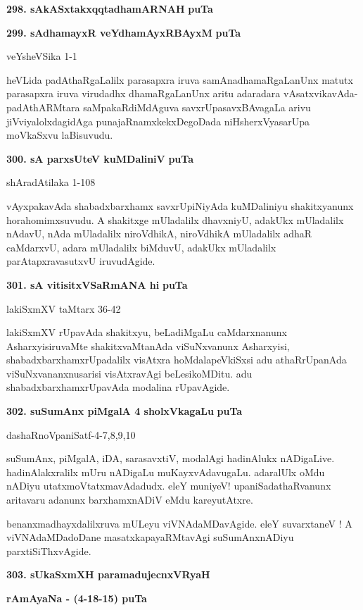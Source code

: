{\medskip
\noindent
\textbf{298. sAkASxtakxqqtadhamARNAH} \hfill {\bf puTa \pageref{106}}

\smallskip
\noindent
\textbf{299. sAdhamayxR veYdhamAyxRBAyxM}  \hfill {\bf puTa \pageref{41c}}

\hfill veYsheVSika 1-1

\smallskip
heVLida padAthaRgaLalilx parasapxra iruva samAnadhamaRgaLanUnx matutx para\-sapxra iruva virudadhx dhamaR\-gaLanUnx aritu adaradara vAsatxvikavAda-padAthARMtara saMpakaRdiMdAguva savxrUpasavxBAvagaLa arivu jiVviyalolxdagidAga punajaRnamxkekxDegoDada niHsherxVyasarUpa moVkaSxvu laBisuvudu.

\medskip
\noindent
\textbf{300. sA parxsUteV kuMDaliniV} \hfill {\bf puTa \pageref{59}}

\hfill shAradAtilaka 1-108

\smallskip
vAyxpakavAda shabadxbarxhamx savxrUpiNiyAda kuMDaliniyu shakitxyanunx hora\-homimxsuvudu. A shakitx\-ge mUladalilx dhavxniyU, adakUkx mUladalilx nAdavU, nAda mUladalilx niroVdhikA, niroV\-dhikA mUla\-dalilx adhaR caMdarxvU, adara mUladalilx biMduvU, adakUkx mUladalilx parAtapxravasutxvU iruvu\-dAgide.

\medskip
\noindent
\textbf{301. sA vitisitxVSaRmANA hi} \hfill {\bf puTa \pageref{157a}}

\hfill lakiSxmXV taMtarx 36-42

\smallskip
lakiSxmXV rUpavAda shakitxyu, beLadiMgaLu caMdarxnanunx AsharxyisiruvaMte shakitxvaMtanAda viSuNx\-vanunx Asharxyisi, shabadxbarxhamxrUpadalilx visAtxra hoMdalapeVkiSxsi adu athaR\-rUpa\-nAda viSuNxvananxnusarisi visAtxravAgi beLesikoMDitu. adu shabadxbarxhamxrUpavAda modalina rUpa\-vAgide.

\medskip
\noindent
\textbf{302. suSumAnx piMgalA 4 sholxVkagaLu} \hfill {\bf puTa \pageref{82}}

\hfill dashaRnoVpaniSatf-4-7,8,9,10

\smallskip
suSumAnx, piMgalA, iDA, sarasavxtiV, modalAgi hadinAlukx nADigaLive. hadinAlakxralilx mUru nADigaLu muKayxvAdavugaLu. adaralUlx oMdu nADiyu utatxmoVtatxmavAdadudx. eleY muniyeV! upa\-niSadathaRvanunx aritavaru adanunx barxhamxnADiV eMdu kareyutAtxre.

benanxmadhayxdalilxruva mULeyu viVNAdaMDavAgide. eleY suvarxtaneV ! A viVNAdaMDadoDane masatxka\-payaRMtavAgi suSumAnxnADiyu parxtiSiThxvAgide.

\medskip
\noindent
\textbf{303. sUkaSxmXH paramadujecnxVRyaH} 

\hfill {\bf rAmAyaNa - (4-18-15) puTa \pageref{40}}

}
